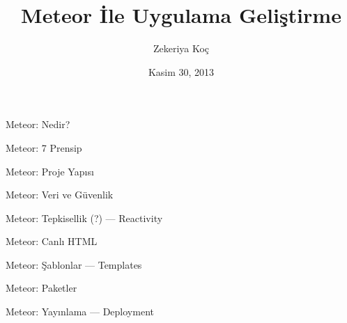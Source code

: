 \documentclass{beamer}
\title[Meteor 101]{Meteor \.{I}le Uygulama Geli\c{s}tirme}
\author{Zekeriya Ko\c{c}}
\institute{Metglobal}
\date{Kasim 30, 2013}
\begin{document}
    \begin{frame}
        \titlepage{}
    \end{frame}

    \begin{frame}{Meteor: Nedir?}
    \end{frame}

    \begin{frame}{Meteor: 7 Prensip}
    \end{frame}

    \begin{frame}{Meteor: Proje Yap{\i}s{\i}}
    \end{frame}

    \begin{frame}{Meteor: Veri ve G\"uvenlik}
    \end{frame}

    \begin{frame}{Meteor: Tepkisellik (?) --- Reactivity}
    \end{frame}

    \begin{frame}{Meteor: Canl{\i} HTML}
    \end{frame}

    \begin{frame}{Meteor: \c{S}ablonlar --- Templates}
    \end{frame}

    \begin{frame}{Meteor: Paketler}
    \end{frame}

    \begin{frame}{Meteor: Yay{\i}nlama --- Deployment}
    \end{frame}
\end{document}
